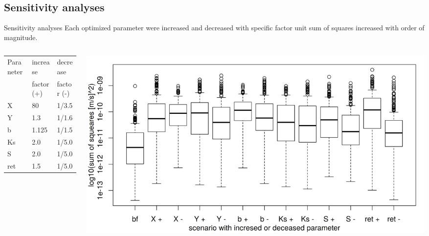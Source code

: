 
\subsection{Sensitivity analyses}
\begin{block}{Sensitivity analyses}
\justifying
Each optimized parameter were increased and decreased with specific factor unit sum of squares increased with order of magnitude. 
\begin{columns}
    \begin{column}{0.4\textwidth}
        \begin{table}[]
            \begin{tabular}{lll}
                \hline
                \hline
                Paraneter & increase   & decrease \\
                          & factor (+) & factor (-) \\
                \hline
                X         & 80                  & 1/3.5               \\
                Y         & 1.3                 & 1/1.6               \\
                b         & 1.125               & 1/1.5               \\
                Ks        & 2.0                 & 1/5.0               \\
                S         & 2.0                 & 1/5.0               \\
                ret       & 1.5                 & 1/5.0              \\
                \hline
                \hline
            \end{tabular}
        \end{table}
    \end{column}
    \begin{column}{0.6\textwidth}
        \includegraphics[width = \textwidth]{obr/sens.png}
    \end{column}
\end{columns}
\end{block}


